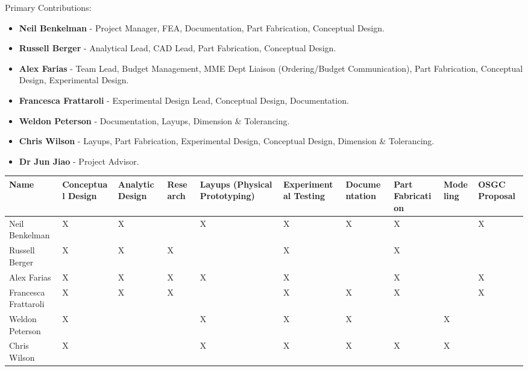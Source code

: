 
\large Primary Contributions:
\normal
\begin{itemize}
    \item \textbf{Neil Benkelman} - Project Manager, FEA, Documentation, Part Fabrication, Conceptual Design.

\item \textbf{Russell Berger} - Analytical Lead, CAD Lead, Part Fabrication, Conceptual Design.

\item \textbf{Alex Farias} - Team Lead, Budget Management, MME Dept Liaison (Ordering/Budget Communication), Part Fabrication, Conceptual Design, Experimental Design.

\item \textbf{Francesca Frattaroli} - Experimental Design Lead, Conceptual Design, Documentation.

\item \textbf{Weldon Peterson} - Documentation, Layups, Dimension \& Tolerancing.

\item \textbf{Chris Wilson} - Layups, Part Fabrication, Experimental Design, Conceptual Design, Dimension \& Tolerancing.

\item \textbf{Dr Jun Jiao} - Project Advisor.

\end{itemize}



\begin{table*}[h]
\footnotesize
\centering
{}
\begin{tabular}{|p{1.2cm}||p{1.4cm}|p{1.1cm}|p{1.1cm}|p{2cm}|p{1.5cm}|p{1.8cm}|p{1.2cm}|p{1.1cm}|p{1.1cm}| }
 \hline
 
 Name  & Conceptual Design & Analytic Design & Research  & Layups (Physical Prototyping)  &Experimental Testing & Documentation &Part Fabrication & Modeling & OSGC Proposal\\
 \hline
 Neil Benkelman & X & X & & X & X & X & X & & X\\
 \hline
 Russell Berger & X & X & X &  & X &  & X & & \\
 \hline
 Alex Farias & X & X & X & X & X & & X & & X\\
 \hline
 Francesca Frattaroli & X & X & X &  & X & X & X & & X\\
 \hline
 Weldon Peterson & X &  & & X & X & X &  &X & \\
 \hline
 Chris Wilson & X &  & & X & X & X & X & X & \\
 \hline
 \end{tabular}
\label{tab:MemberSummary}
\centering
\end{table*}

